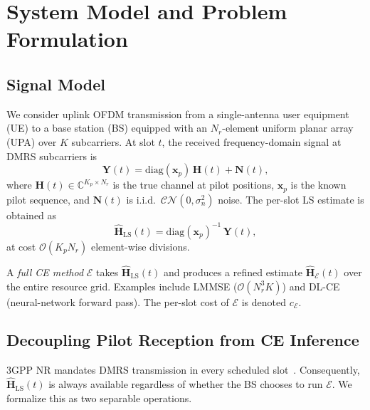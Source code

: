
\section{System Model and Problem Formulation}\label{Formulation}

\subsection{Signal Model}

We consider uplink OFDM transmission from a single-antenna user equipment (UE) to a base station (BS) equipped with an $N_r$-element uniform planar array (UPA) over $K$ subcarriers.
At slot $t$, the received frequency-domain signal at DMRS subcarriers is
%
\begin{equation}\label{eq:rx}
  \mathbf{Y}(t) = \mathrm{diag}(\mathbf{x}_p)\,\mathbf{H}(t) + \mathbf{N}(t),
\end{equation}
%
where $\mathbf{H}(t) \in \mathbb{C}^{K_p \times N_r}$ is the true channel at pilot positions, $\mathbf{x}_p$ is the known pilot sequence, and $\mathbf{N}(t)$ is i.i.d.\ $\mathcal{CN}(0, \sigma_n^2)$ noise.
The per-slot LS estimate is obtained as
%
\begin{equation}\label{eq:ls}
  \hat{\mathbf{H}}_{\mathrm{LS}}(t) = \mathrm{diag}(\mathbf{x}_p)^{-1}\,\mathbf{Y}(t),
\end{equation}
%
at cost $\mathcal{O}(K_p N_r)$ element-wise divisions.

A \emph{full CE method} $\mathcal{E}$ takes $\hat{\mathbf{H}}_{\mathrm{LS}}(t)$ and produces a refined estimate $\hat{\mathbf{H}}_{\mathcal{E}}(t)$ over the entire resource grid.
Examples include LMMSE ($\mathcal{O}(N_r^3 K)$) and DL-CE (neural-network forward pass).
The per-slot cost of $\mathcal{E}$ is denoted $c_{\mathcal{E}}$.

\subsection{Decoupling Pilot Reception from CE Inference}

3GPP NR mandates DMRS transmission in every scheduled slot~\cite{3gpp_ts38211}.
Consequently, $\hat{\mathbf{H}}_{\mathrm{LS}}(t)$ is always available regardless of whether the BS chooses to run $\mathcal{E}$.
We formalize this as two separable operations.


